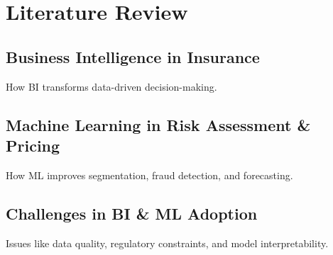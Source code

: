 
\chapter{Literature Review}

\section{Business Intelligence in Insurance}
How BI transforms data-driven decision-making.

\section{Machine Learning in Risk Assessment \& Pricing}
How ML improves segmentation, fraud detection, and forecasting.

\section{Challenges in BI \& ML Adoption}
Issues like data quality, regulatory constraints, and model interpretability.

